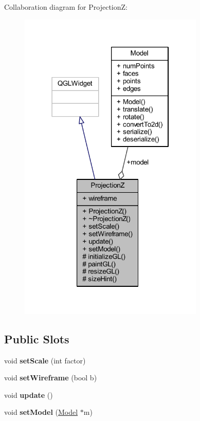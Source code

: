Collaboration diagram for ProjectionZ\+:
\nopagebreak
\begin{figure}[H]
\begin{center}
\leavevmode
\includegraphics[width=250pt]{class_projection_z__coll__graph}
\end{center}
\end{figure}
\subsection*{Public Slots}
\begin{DoxyCompactItemize}
\item 
\mbox{\label{class_projection_z_a21e56fe128f64983203888507845847d}} 
void {\bfseries set\+Scale} (int factor)
\item 
\mbox{\label{class_projection_z_a61a7115d258f9324b5f697983dd5ca3d}} 
void {\bfseries set\+Wireframe} (bool b)
\item 
\mbox{\label{class_projection_z_abf7cbd3b5479c7805fbceecf3c68b0be}} 
void {\bfseries update} ()
\item 
\mbox{\label{class_projection_z_af65afd9bf93b40bbf626cd2fba303b3f}} 
void {\bfseries set\+Model} (\mbox{\hyperlink{class_model}{Model}} $\ast$m)
\end{DoxyCompactItemize}
